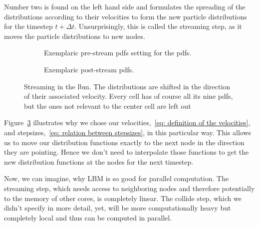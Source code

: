 Number two is found on the left hand side and formulates the spreading of the distributions according to their velocities to form the new particle distributions for the timestep $t+\Delta t$.
Unsurprisingly, this is called the streaming step, as it moves the particle distributions to new nodes.

\begin{figure}
\centering
\begin{subfigure}{.5\textwidth}
  \centering
  
\caption{Exemplaric pre-stream \glspl{pdf} setting for the \glspl{pdf}.}
\label{fig: pre-stream example}
\end{subfigure}%
\begin{subfigure}{.5\textwidth}
  \centering
  
  \caption{Exemplaric post-stream \glspl{pdf}.\linebreak}
\label{fig: post-collision example}
\end{subfigure}
\caption{Streaming in the \gls{lbm}. The distributions are shifted in the direction of their associated velocity. Every cell has of course all its nine \glspl{pdf}, but the ones not relevant to the center cell are left out}
\label{fig: examplary stream}
\end{figure}

Figure~\ref{fig: examplary stream} illustrates why we chose our velocities,~\eqref{eq: definition of the velocities}, and stepsizes,~\eqref{eq: relation between stepsizes}, in this particular way.
This allows us to move our distribution functions exactly to the next node in the direction they are pointing. Hence we don't need to interpolate those functions to get the new distribution functions at the nodes for the next timestep.

Now, we can imagine, why LBM is so good for parallel computation.
The streaming step, which needs access to neighboring nodes and therefore potentially to the memory of other cores, is completely linear.
The collide step, which we didn't specify in more detail, yet, will be more computationally heavy but completely local and thus can be computed in parallel.
